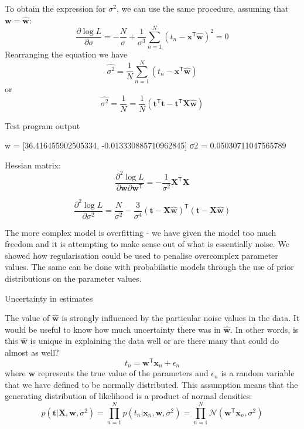 \documentclass[a4paper,11pt]{article} %
\begin{document}
To obtain the expression for $\sigma^2$, we can use the same procedure,
assuming that $\mathbf{w} = \widehat{\mathbf{w}}$:
\begin{equation}
\frac{\partial \log L}{\partial \sigma} = -\frac{N}{\sigma} +
\frac{1}{\sigma^3}\sum_{n=1}^{N} (t_{n} - \mathbf{x}^{\mathsf{T}}\widehat{\mathbf{w}})^2 = 0
\end{equation}
Rearranging the equation we have
\begin{equation}
\widehat{\sigma^2} = \frac{1}{N}\sum_{n=1}^{N} (t_n - \mathbf{x}^{\mathsf{T}}\widehat{\mathbf{w}})
\end{equation}
or
\begin{equation}
\widehat{\sigma^2} = \frac{1}{N} = \frac{1}{N}\left(
\mathbf{t}^{\mathsf{T}}\mathbf{t} - \mathbf{t}^{\mathsf{T}}\mathbf{X}\widehat{\mathbf{w}}
\right)
\end{equation}

Test program output
\begin{textcode}
w = [36.416455902505334, -0.013330885710962845]
σ2 = 0.05030711047565789
\end{textcode}

Hessian matrix:
\begin{equation}
\frac{\partial^2 \log L}{\partial\mathbf{w}\partial\mathbf{w}^{\mathsf{T}}} =
-\frac{1}{\sigma^2}\mathbf{X}^{\mathsf{T}}\mathbf{X}
\end{equation}

\begin{equation}
\frac{\partial^2\log L}{\partial \sigma^2} = \frac{N}{\sigma^2} -
\frac{3}{\sigma^4}(\mathbf{t} - \mathbf{X}\widehat{\mathbf{w}})^{\mathsf{T}}
(\mathbf{t} - \mathbf{X}\widehat{\mathbf{w}})
\end{equation}

The more complex model is overfitting - we have given the model too
much freedom and it is attempting to make sense out of what is essentially noise.
We showed how regularisation could be used to penalise overcomplex
parameter values. The same can be done with probabilistic models through the use
of prior distributions on the parameter values.

Uncertainty in estimates

The value of $\widehat{\mathbf{w}}$ is strongly influenced by the particular noise values in the data.
It would be useful to know how much uncertainty there was in $\widehat{\mathbf{w}}$.
In other words, is this $\widehat{\mathbf{w}}$ is unique in explaining the data well or are there
many that could do almost as well?
\begin{equation}
t_{n} = \mathbf{w}^{\mathsf{T}}\mathbf{x}_{n} + \epsilon_{n}
\end{equation}
where $\mathbf{w}$ represents the true value of the parameters and $\epsilon_n$ is a random
variable that we have defined to be normally distributed. This assumption means that the
generating distribution of likelihood is a product of normal densities:
\begin{equation}
p(\mathbf{t}|\mathbf{X},\mathbf{w},\sigma^2) =
\prod_{n=1}^{N} p(t_{n} | \mathbf{x}_{n},\mathbf{w},\sigma^2) =
\prod_{n=1}^{N} \mathcal{N}(\mathbf{w}^{\mathsf{T}}\mathbf{x}_{n},\sigma^2)
\end{equation}
\end{document}

